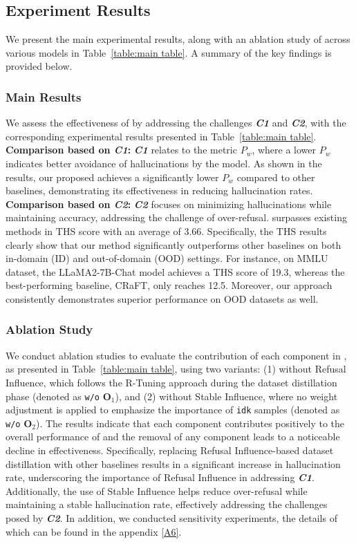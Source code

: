 \subsection{Experiment Results}
We present the main experimental results, along with an ablation study of \M across various models in Table~\ref{table:main table}. A summary of the key findings is provided below.

\subsubsection{Main Results}
We assess the effectiveness of \M by addressing the challenges \textbf{\textit{C1}} and \textbf{\textit{C2}}, with the corresponding experimental results presented in Table~\ref{table:main table}. \\
\textbf{Comparison based on \textit{C1}:} \textbf{\textit{C1}} relates to the metric \(P_w\), where a lower \(P_w\) indicates better avoidance of hallucinations by the model. As shown in the results, our proposed \M achieves a significantly lower \(P_w\) compared to other baselines, demonstrating its effectiveness in reducing hallucination rates. \\
\textbf{Comparison based on \textit{C2}:} \textbf{\textit{C2}} focuses on minimizing hallucinations while maintaining accuracy, addressing the challenge of over-refusal. 
\M surpasses existing methods in THS score with an average of 3.66.
Specifically, the THS results clearly show that our method significantly outperforms other baselines on both in-domain (ID) and out-of-domain (OOD) settings. For instance, on MMLU dataset, the LLaMA2-7B-Chat model achieves a THS score of 19.3, whereas the best-performing baseline, CRaFT, only reaches 12.5. Moreover, our approach consistently demonstrates superior performance on OOD datasets as well.

\subsubsection{Ablation Study}
We conduct ablation studies to evaluate the contribution of each component in \M, as presented in Table~\ref{table:main table}, using two variants: (1) \M without Refusal Influence, which follows the R-Tuning approach during the dataset distillation phase (denoted as \texttt{w/o} $\mathbf{O}_1$), and (2) \M without Stable Influence, where no weight adjustment is applied to emphasize the importance of \texttt{idk} samples (denoted as \texttt{w/o} $\mathbf{O}_2$). The results indicate that each component contributes positively to the overall performance of \M and the removal of any component leads to a noticeable decline in effectiveness. Specifically, replacing Refusal Influence-based dataset distillation with other baselines results in a significant increase in hallucination rate, underscoring the importance of Refusal Influence in addressing \textbf{\textit{C1}}. Additionally, the use of Stable Influence helps reduce over-refusal while maintaining a stable hallucination rate, effectively addressing the challenges posed by \textbf{\textit{C2}}. In addition, we conducted sensitivity experiments, the details of which can be found in the appendix \ref{A6}.

